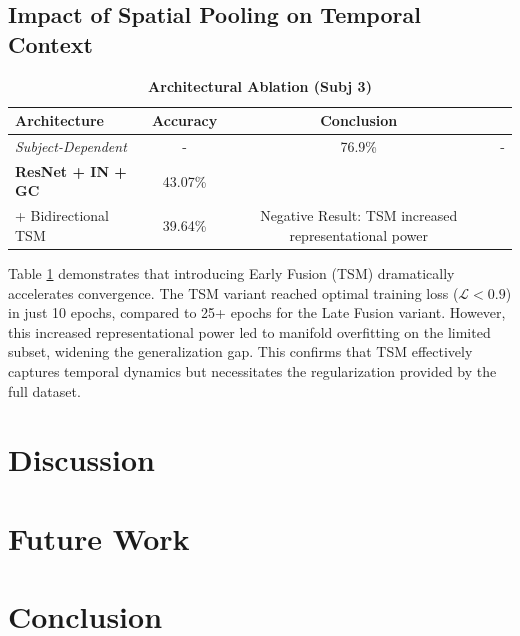\documentclass[conference]{IEEEtran}
\begin{document}
\subsection{Impact of Spatial Pooling on Temporal Context}

\begin{table}[htbp]
    \caption{\textbf{Architectural Ablation (Subj 3)}}
    \label{tab:ablation_arch}
    \centering
    \begin{tabular}{lccc}
        \toprule
        \textbf{Architecture} & \textbf{Accuracy} & \textbf{Conclusion} \\
        \midrule
        \textit{Subject-Dependent} & - & 76.9\% & - \\
        \midrule
        \textbf{ResNet + IN + GC} & 43.07\% &  \\ 
        + Bidirectional TSM & 39.64\% & Negative Result: TSM increased representational power \\ 
        \bottomrule
    \end{tabular}
    \vspace{2mm}
\end{table}

Table \ref{tab:ablation_arch} demonstrates that introducing Early Fusion (TSM) dramatically accelerates convergence. The TSM variant reached optimal training loss ($\mathcal{L} < 0.9$) in just 10 epochs, compared to 25+ epochs for the Late Fusion variant. However, this increased representational power led to manifold overfitting on the limited subset, widening the generalization gap. This confirms that TSM effectively captures temporal dynamics but necessitates the regularization provided by the full dataset.

\section{Discussion}





\section{Future Work}

\section{Conclusion}









\end{document}
